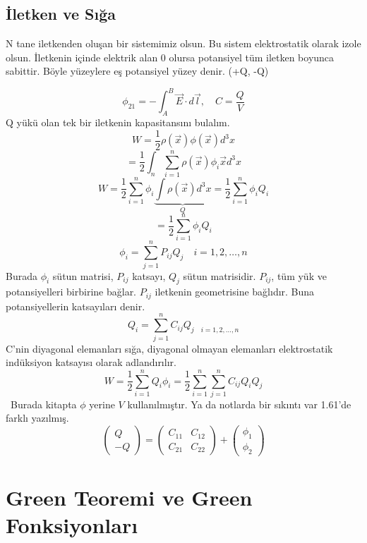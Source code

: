 \newpage
\subsection{İletken ve Sığa}
\begin{theorem}
    N tane iletkenden oluşan bir sistemimiz olsun. Bu sistem elektrostatik olarak izole olsun. İletkenin içinde elektrik alan 0 olursa potansiyel tüm iletken boyunca sabittir. Böyle yüzeylere eş potansiyel yüzey denir. (+Q, -Q)

\[ \phi_{21} = - \int_{A}^{B} \Vec{E} \cdot d\Vec{l}, \quad C=\dfrac{Q}{V} \]
Q yükü olan tek bir iletkenin kapasitansını bulalım.
\[ W = \dfrac{1}{2} \rho (\Vec{x}) \phi (\Vec{x}) d^{3}x \]
\[= \dfrac{1}{2} \int_{n} \sum_{i=1}^{n} \rho (\Vec{x}) \phi_{i} \Vec{x} d^{3}x  \]
\[W = \dfrac{1}{2} \sum_{i=1}^{n} \phi_{i} \underbrace{\int \rho (\Vec{x})  d^{3}x}_{Q} = \dfrac{1}{2}  \sum_{i=1}^{n} \phi_{i} Q_{i} \]
\[ = \dfrac{1}{2}  \sum_{i=1}^{n} \phi_{i} Q_{i} \]
\[ \phi_{i} = \sum_{j=1}^{n} P_{ij} Q_{j} \quad i=1,2,\dots,n \]
Burada $\phi_{i}$ sütun matrisi, $P_{ij}$ katsayı, $Q_{j}$ sütun matrisidir. $P_{ij}$, tüm yük ve potansiyelleri birbirine bağlar. $P_{ij}$ iletkenin geometrisine bağlıdır. Buna potansiyellerin katsayıları denir.
\[ Q_{i} = \sum_{j=1}^{n} C_{ij} Q_{j  \quad i=1,2,\dots,n } \tag{1.61} \]
C'nin diyagonal elemanları sığa, diyagonal olmayan elemanları elektrostatik indüksiyon katsayısı olarak adlandırılır.
\[ W = \dfrac{1}{2} \sum_{i=1}^{n} Q_{i} \phi_{i} = \dfrac{1}{2} \sum_{i=1}^{n} \sum_{j=1}^{n} C_{ij} Q_{i} Q_{j} \tag{1.62}\]
\dangersign \ Burada kitapta $\phi$ yerine $V$ kullanılmıştır. Ya da notlarda bir sıkıntı var 1.61'de farklı yazılmış.
\[ \begin{pmatrix}
Q \\ -Q  
\end{pmatrix} =  \begin{pmatrix}
C_{11} & C_{12} \\
C_{21} & C_{22}
\end{pmatrix} + \begin{pmatrix}
\phi_{1} \\ \phi_{2}  
\end{pmatrix}  \]
\end{theorem}



\section{Green Teoremi ve Green Fonksiyonları}

